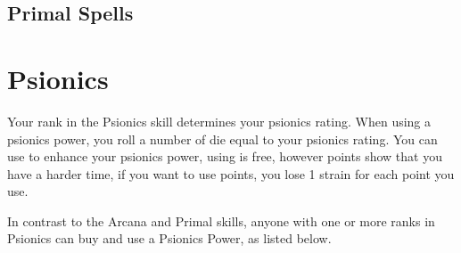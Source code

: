 \begin{multicols}{2}

\subsection{Primal Spells}





\FloatBarrier

\section{Psionics}
Your rank in the Psionics skill determines your psionics rating.
When using a psionics power, you roll a number of \force die equal to your
psionics rating. You can use \darklight to enhance your psionics power,
using \light is free, however \dark points show that you have a harder time,
if you want to use \dark points, you lose 1 strain for each \dark point you
use.

In contrast to the Arcana and Primal skills, anyone with one or more ranks
in Psionics can buy and use a Psionics Power, as listed below.

\end{multicols}
\newpage






